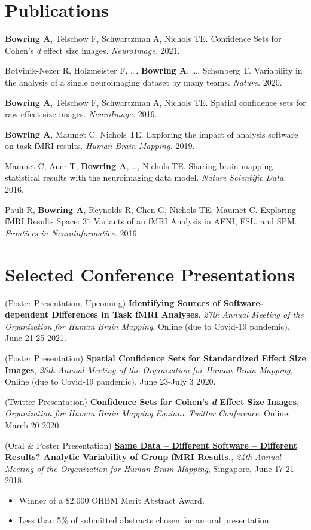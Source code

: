 \documentclass[a4paper,10pt]{article}
\begin{document}
\section{Publications}
\textbf{Bowring A}, Telschow F, Schwartzman A, Nichols TE. Confidence Sets for Cohen's \textit{d} effect size images. \textit{NeuroImage.} 2021. 

Botvinik-Nezer R, Holzmeister  F, \dots, \textbf{Bowring A}, \dots, Schonberg T. Variability in the analysis of a single neuroimaging dataset by many teams. \textit{Nature.} 2020.

\textbf{Bowring A}, Telschow F, Schwartzman A, Nichols TE. Spatial confidence sets for raw effect size images. \textit{NeuroImage.} 2019. 

\textbf{Bowring A}, Maumet C, Nichols TE. Exploring the impact of analysis software on task fMRI results. \textit{Human Brain Mapping.} 2019. 

Maumet C, Auer T, \textbf{Bowring A}, \dots, Nichols TE. Sharing brain mapping statistical results with the neuroimaging data model. \textit{Nature Scientific Data.} 2016.

Pauli R, \textbf{Bowring A}, Reynolds R, Chen G, Nichols TE, Maumet C. Exploring fMRI Results Space: 31 Variants of an fMRI Analysis in AFNI, FSL, and SPM. \textit{Frontiers in Neuroinformatics.} 2016.\\

\section{Selected Conference Presentations}
(Poster Presentation, Upcoming) \textbf{Identifying Sources of Software-dependent Differences in Task fMRI Analyses}, \textit{27th Annual Meeting of the Organization for Human Brain Mapping}, Online (due to Covid-19 pandemic), June 21-25 2021.

(Poster Presentation) \textbf{Spatial Confidence Sets for Standardized Effect Size Images}, \textit{26th Annual Meeting of the Organization for Human Brain Mapping}, Online (due to Covid-19 pandemic), June 23-July 3 2020. 

(Twitter Presentation) \textbf{\href{https://twitter.com/OHBMequinoX/status/1240926466302500864}{Confidence Sets for Cohen’s \textit{d} Effect Size Images}}, \textit{Organization for Human Brain Mapping Equinox Twitter Conference}, Online, March 20 2020. 

(Oral \& Poster Presentation) \textbf{\href{https://www.pathlms.com/ohbm/courses/8246/sections/12541/video_presentations/116000}{Same Data – Different Software – Different Results? Analytic Variability of Group fMRI Results.}}, \textit{24th Annual Meeting of the Organization for Human Brain Mapping}, Singapore, June 17-21 2018. 
\vspace{-2mm}
\begin{itemize}
\item Winner of a \$2,000 OHBM Merit Abstract Award.
\vspace{-2mm}
\item Less than 5\% of submitted abstracts chosen for an oral presentation. 
\end{itemize}
\end{document}
